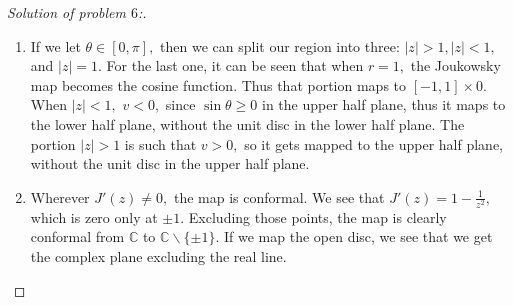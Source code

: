 \documentclass[letterpaper,11pt,twoside]{article}
\theoremstyle{proposition}
\theoremstyle{definition}
\theoremstyle{theorem}
\theoremstyle{definition}
\theoremstyle{definition}
\theoremstyle{definition}
\theoremstyle{lemma}
\theoremstyle{definition}
\theoremstyle{definition}
\theoremstyle{corollary}
\theoremstyle{definition}
\theoremstyle{definition}
\theoremstyle{definition}
\newcommand{\abs}[1]{\left \vert #1 \right \vert}
\begin{document}
\begin{proof}[Solution of problem $6$:]
\begin{enumerate}
		which is the range of the cosine. 
		\item If we let $\theta \in [0,\pi],$ then we can split our region into three: $|z| >1, \abs{z} < 1,$ and $\abs{z}=1.$ For the last one, it can be 
		seen that when $r=1,$ the Joukowsky map becomes the cosine function. Thus that portion maps to $[-1,1] \times 0.$ When $\abs{z}<1,$ $v<0,$ since 
		$\sin \theta \geq 0$ in the upper half plane, thus it maps to the lower half plane, without the unit disc in the lower half plane. The portion 
		$\abs{z}>1$ is such that $v>0,$ so it gets mapped to the upper half plane, without the unit disc in the upper half plane. 
 		
		\item Wherever $J'(z) \neq 0,$ the map is conformal. We see that $J'(z)= 1 - \frac{1}{z^2},$ which is zero only at $\pm 1.$ Excluding those points, 
		the map is clearly conformal from $\mathbb{C} $ to $\mathbb{C} \backslash \{\pm 1\}.$ If we map the open disc, we see that we get the complex plane 
		excluding the real line. 
		
	\end{enumerate}
	\end{proof}
\end{document}
